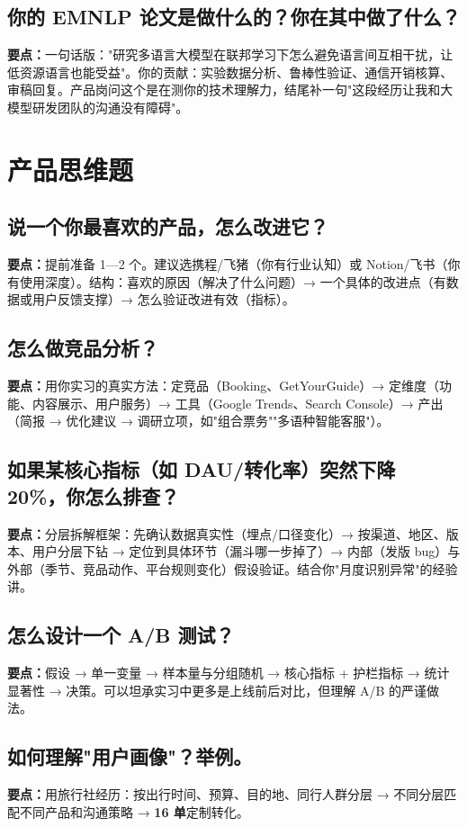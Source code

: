 \documentclass[zihao=-4,autoindent=2em]{ctexart}
\begin{document}
\subsection{你的 EMNLP 论文是做什么的？你在其中做了什么？}
\textbf{要点：}一句话版："研究多语言大模型在联邦学习下怎么避免语言间互相干扰，让低资源语言也能受益"。你的贡献：实验数据分析、鲁棒性验证、通信开销核算、审稿回复。产品岗问这个是在测你的技术理解力，结尾补一句"这段经历让我和大模型研发团队的沟通没有障碍"。

\section{产品思维题}

\subsection{说一个你最喜欢的产品，怎么改进它？}
\textbf{要点：}提前准备 1—2 个。建议选携程/飞猪（你有行业认知）或 Notion/飞书（你有使用深度）。结构：喜欢的原因（解决了什么问题）→ 一个具体的改进点（有数据或用户反馈支撑）→ 怎么验证改进有效（指标）。

\subsection{怎么做竞品分析？}
\textbf{要点：}用你实习的真实方法：定竞品（Booking、GetYourGuide）→ 定维度（功能、内容展示、用户服务）→ 工具（Google Trends、Search Console）→ 产出（简报 → 优化建议 → 调研立项，如"组合票务""多语种智能客服"）。

\subsection{如果某核心指标（如 DAU/转化率）突然下降 20\%，你怎么排查？}
\textbf{要点：}分层拆解框架：先确认数据真实性（埋点/口径变化）→ 按渠道、地区、版本、用户分层下钻 → 定位到具体环节（漏斗哪一步掉了）→ 内部（发版 bug）与外部（季节、竞品动作、平台规则变化）假设验证。结合你"月度识别异常"的经验讲。

\subsection{怎么设计一个 A/B 测试？}
\textbf{要点：}假设 → 单一变量 → 样本量与分组随机 → 核心指标 + 护栏指标 → 统计显著性 → 决策。可以坦承实习中更多是上线前后对比，但理解 A/B 的严谨做法。

\subsection{如何理解"用户画像"？举例。}
\textbf{要点：}用旅行社经历：按出行时间、预算、目的地、同行人群分层 → 不同分层匹配不同产品和沟通策略 → \textbf{16 单}定制转化。
\end{document}
